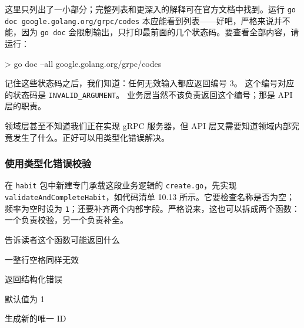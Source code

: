这里只列出了一小部分；完整列表和更深入的解释可在官方文档中找到。运行 \texttt{go doc google.golang.org/grpc/codes} 本应能看到列表——好吧，严格来说并不能，因为 \texttt{go doc} 会限制输出，只打印最前面的几个状态码。要查看全部内容，请运行：

\begin{shellcode}[]
> go doc --all google.golang.org/grpc/codes
\end{shellcode}

记住这些状态码之后，我们知道：任何无效输入都应返回编号 3。
这个编号对应的状态码是 \texttt{INVALID\_ARGUMENT}。
业务层当然不该负责返回这个编号；那是 API 层的职责。

领域层甚至不知道我们正在实现 gRPC 服务器，但 API 层又需要知道领域内部究竟发生了什么。正好可以用类型化错误解决。

\subsubsection{使用类型化错误校验}

在 \texttt{habit} 包中新建专门承载这段业务逻辑的 \texttt{create.go}，先实现 \texttt{validateAndCompleteHabit}，如代码清单 10.13 所示。它要检查名称是否为空；频率为空时设为 \texttt{1}；还要补齐两个内部字段。严格说来，这也可以拆成两个函数：一个负责校验，另一个负责补全。


\begin{codeannotations}
\item 告诉读者这个函数可能返回什么
\item 一整行空格同样无效
\item 返回结构化错误
\item 默认值为 1
\item 生成新的唯一 ID
\end{codeannotations}


